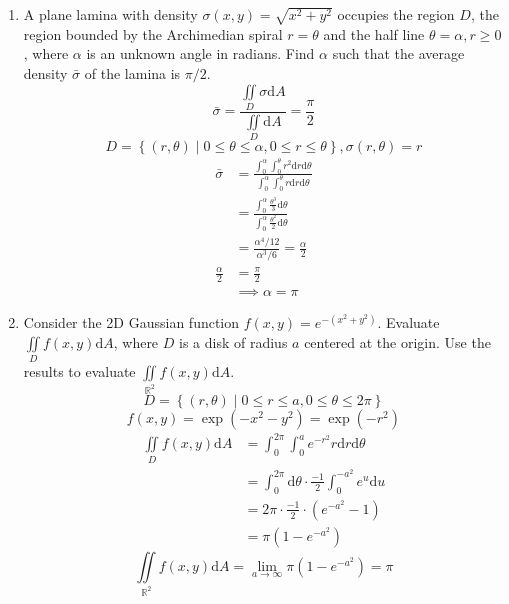 \begin{enumerate}
	\item A plane lamina with density $\sigma(x,y) = \sqrt{x^2+y^2}$ occupies the region $D$, the region bounded by the Archimedian spiral $r = \theta$ and the half line $\theta = \alpha, r \geq 0$, where $\alpha$ is an unknown angle in radians. Find $\alpha$ such that the average density $\bar{\sigma}$ of the lamina is $\pi / 2$.
	\begin{equation*}
			\bar{\sigma} = \frac{\iint\limits_{D}{\sigma\mathrm{d}A}}{\iint\limits_{D}{\mathrm{d}A}} = \frac{\pi}{2}
	\end{equation*}
	\begin{equation*}
		D = \left\{(r,\theta) \mid 0 \leq \theta \leq \alpha, 0 \leq r \leq \theta \right\}, \sigma(r,\theta) = r
	\end{equation*}
	\begin{align*}
		\bar{\sigma} &= \frac{\int_{0}^{\alpha}{\int_{0}^{\theta}{r^2\mathrm{d}r}\mathrm{d}\theta}}{\int_{0}^{\alpha}{\int_{0}^{\theta}{r\mathrm{d}r}\mathrm{d}\theta}} \\
		&= \frac{\int_{0}^{\alpha}{\frac{\theta^3}{3}\mathrm{d}\theta}}{\int_{0}^{\alpha}{\frac{\theta^2}{2}\mathrm{d}\theta}} \\
		&= \frac{\alpha^4/12}{\alpha^3/6} = \frac{\alpha}{2} \\
		\frac{\alpha}{2} &= \frac{\pi}{2} \\
		&\implies \alpha = \pi		
	\end{align*}
	
	\item Consider the 2D Gaussian function $f(x,y) = e^{-(x^2+y^2)}$. Evaluate $\iint\limits_{D}{f(x,y)\mathrm{d}A}$, where $D$ is a disk of radius $a$ centered at the origin. Use the results to evaluate $\iint\limits_{\mathbb{R}^2}{f(x,y)\mathrm{d}A}$.
	\begin{equation*}
		D = \left\{(r,\theta) \mid 0 \leq r \leq a, 0 \leq \theta \leq 2\pi \right\}
	\end{equation*}
	\begin{equation*}
		f(x,y) = \exp{(-x^2-y^2)} = \exp{(-r^2)}	
	\end{equation*}
	\begin{align*}
		\iint\limits_{D}{f(x,y)\mathrm{d}A} &= \int_{0}^{2\pi}{\int_{0}^{a}{e^{-r^2}r\mathrm{d}r}\mathrm{d}\theta} \\
		&= \int_{0}^{2\pi}{\mathrm{d}\theta} \cdot \frac{-1}{2}\int_{0}^{-a^2}{e^{u}\mathrm{d}u} \\
		&= 2\pi \cdot \frac{-1}{2} \cdot \left(e^{-a^2} - 1\right) \\
		&= \pi\left(1 - e^{-a^2}\right)
	\end{align*}
	\begin{equation*}
		\iint\limits_{\mathbb{R}^2}{f(x,y)\mathrm{d}A} = \lim_{a \to \infty}{\pi\left(1 - e^{-a^2}\right)} = \pi
	\end{equation*}
\end{enumerate}